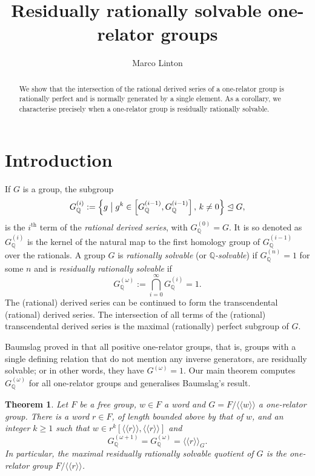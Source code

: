 \documentclass{amsart}
\newtheorem{theorem}{Theorem}[section]
\theoremstyle{definition}
\newcommand{\Q}{\mathbb{Q}}
\newcommand{\normal}[1]{\langle\!\langle #1 \rangle\!\rangle}
\begin{document}
\title{Residually rationally solvable one-relator groups}


\author{Marco Linton}
\address{Instituto de Ciencias Matem\'aticas, CSIC-UAM-UC3M-UCM, Madrid, Spain}

\maketitle

\begin{abstract}
We show that the intersection of the rational derived series of a one-relator group is rationally perfect and is normally generated by a single element. As a corollary, we characterise precisely when a one-relator group is residually rationally solvable.
\end{abstract}

\section{Introduction}


If $G$ is a group, the subgroup
\[
G^{(i)}_{\Q} := \left\{g \bigm\vert g^k\in \left[G_{\Q}^{(i-1)}, G^{(i-1)}_{\Q}\right],\, k\neq 0\right\}\trianglelefteq G,
\]
is the $i^{\text{th}}$ term of the \emph{rational derived series}, with $G^{(0)}_{\Q} = G$. It is so denoted as $G^{(i)}_{\Q}$ is the kernel of the natural map to the first homology group of $G^{(i-1)}_{\Q}$ over the rationals. A group $G$ is \emph{rationally solvable} (or \emph{$\Q$-solvable}) if $G_{\Q}^{(n)} = 1$ for some $n$ and is \emph{residually rationally solvable} if
\[
G_{\Q}^{(\omega)} := \bigcap_{i=0}^{\infty}G_{\Q}^{(i)} = 1. 
\]
The (rational) derived series can be continued to form the transcendental (rational) derived series. The intersection of all terms of the (rational) transcendental derived series is the maximal (rationally) perfect subgroup of $G$.

Baumslag proved in \cite{Ba71} that all positive one-relator groups, that is, groups with a single defining relation that do not mention any inverse generators, are residually solvable; or in other words, they have $G^{(\omega)} = 1$. Our main theorem computes $G^{(\omega)}_{\Q}$ for all one-relator groups and generalises Baumslag's result.

\begin{theorem}
\label{main}
    Let $F$ be a free group, $w\in F$ a word and $G = F/\normal{w}$ a one-relator group. There is a word $r\in F$, of length bounded above by that of $w$, and an integer $k\geqslant 1$ such that $w\in r^k[\normal{r}, \normal{r}]$ and
    \[
    G_{\Q}^{(\omega+1)} = G_{\Q}^{(\omega)} = \normal{r}_G.
    \]
    In particular, the maximal residually rationally solvable quotient of $G$ is the one-relator group $F/\normal{r}$.
\end{theorem}
\end{document}
